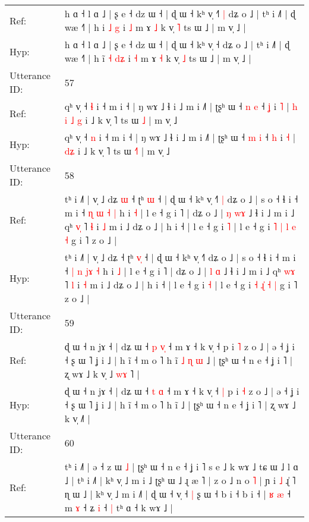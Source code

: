 \documentclass[10pt]{article}
\DeclareRobustCommand{\hl}[1]{{\textcolor{red}{#1}}}
\begin{document}
\begin{longtable}{ll}
Ref: & h ɑ ˧ l ɑ ˩ | ʂ e ˧ dz ɯ ˧ | ɖ ɯ ˧ kʰ v̩ ˧\hl{˥}\hl{ }\hl{|} dʑ o ˩ | tʰ i ˩˥ | ɖ wæ ˧˥ | h i\hl{} \hl{˩} \hl{}\hl{g} i \hl{˩} m ɤ \hl{˩} k v̩ \hl{˥} ts ɯ ˩ | m v̩ ˩ |
 \\
Hyp: & h ɑ ˧ l ɑ ˩ | ʂ e ˧ dz ɯ ˧ | ɖ ɯ ˧ kʰ v̩ ˧\hl{}\hl{}\hl{} dʑ o ˩ | tʰ i ˩˥ | ɖ wæ ˧˥ | h i\hl{̃} \hl{˧} \hl{d}\hl{ʑ} i \hl{˧} m ɤ \hl{˧} k v̩ \hl{˩} ts ɯ ˩ | m v̩ ˩ |
 \\
\midrule
Utterance ID: & 57 \\
Ref: & qʰ v̩ ˧ \hl{ɬ} i ˧ m i ˧ | ŋ wɤ ˩ ɬ i ˩ m i ˩˥ | ʈʂʰ ɯ ˧ \hl{n} \hl{e} ˧ \hl{ʝ} i \hl{˥} |\hl{ }\hl{h}\hl{ }\hl{i} \hl{˩}\hl{ }\hl{g} i ˩ k v̩ ˥ ts ɯ \hl{}\hl{˩} | m v̩ ˩
 \\
Hyp: & qʰ v̩ ˧ \hl{n} i ˧ m i ˧ | ŋ wɤ ˩ ɬ i ˩ m i ˩˥ | ʈʂʰ ɯ ˧ \hl{m} \hl{i} ˧ \hl{h} i \hl{˧} |\hl{}\hl{}\hl{}\hl{} \hl{}\hl{d}\hl{ʑ} i ˩ k v̩ ˥ ts ɯ \hl{˧}\hl{˥} | m v̩ ˩
 \\
\midrule
Utterance ID: & 58 \\
Ref: & tʰ i ˩˥ | v̩ ˩ dʑ\hl{ }\hl{ɯ} ˧ ʈʰ \hl{}\hl{ɯ} ˧ | ɖ ɯ ˧ kʰ v̩ ˧˥\hl{ }\hl{|} dʑ o ˩ | s o ˧ ɬ i ˧ m i ˧ \hl{ɳ} \hl{ɯ} \hl{}\hl{˧} \hl{|} h i \hl{˧} | l e ˧ g i ˥ | dʑ o ˩ | \hl{ŋ} \hl{w}\hl{ɤ} ˩ ɬ i ˩ m i ˩ qʰ \hl{v}\hl{̩} ˥ \hl{ɬ} i \hl{˩} m i ˩ dʑ o ˩ | h i ˧ | l e ˧ g i \hl{˥} | l e ˧ g i \hl{˥} \hl{|}\hl{ }\hl{l} \hl{e} \hl{˧} g i ˥ z o ˩ |
 \\
Hyp: & tʰ i ˩˥ | v̩ ˩ dʑ\hl{}\hl{} ˧ ʈʰ \hl{v}\hl{̩} ˧ | ɖ ɯ ˧ kʰ v̩ ˧˥\hl{}\hl{} dʑ o ˩ | s o ˧ ɬ i ˧ m i ˧ \hl{|} \hl{n} \hl{j}\hl{ɤ} \hl{˧} h i \hl{˩} | l e ˧ g i ˥ | dʑ o ˩ | \hl{l} \hl{}\hl{ɑ} ˩ ɬ i ˩ m i ˩ qʰ \hl{w}\hl{ɤ} ˥ \hl{l} i \hl{˧} m i ˩ dʑ o ˩ | h i ˧ | l e ˧ g i \hl{˧} | l e ˧ g i \hl{˧} \hl{}\hl{ɻ}\hl{̍} \hl{˧} \hl{|} g i ˥ z o ˩ |
 \\
\midrule
Utterance ID: & 59 \\
Ref: & ɖ ɯ ˧ n jɤ ˧ | dʑ ɯ ˧ \hl{p} \hl{v}\hl{̩} ˧ m ɤ ˧ k v̩ ˧\hl{}\hl{} p i \hl{˥} z o ˩ | ə ˧ ʝ i ˧ ʂ ɯ ˥ ʝ i ˩ | h ĩ ˧ m o ˥ h ĩ\hl{ }\hl{˩}\hl{ }\hl{ɳ}\hl{ }\hl{ɯ} ˩ | ʈʂʰ ɯ ˧ n e ˧ ʝ i ˥ | ʐ wɤ ˩ k v̩ ˩\hl{ }\hl{w}\hl{ɤ}\hl{ }˥ |
 \\
Hyp: & ɖ ɯ ˧ n jɤ ˧ | dʑ ɯ ˧ \hl{t} \hl{}\hl{ɑ} ˧ m ɤ ˧ k v̩ ˧\hl{ }\hl{|} p i \hl{˧} z o ˩ | ə ˧ ʝ i ˧ ʂ ɯ ˥ ʝ i ˩ | h ĩ ˧ m o ˥ h ĩ\hl{}\hl{}\hl{}\hl{}\hl{}\hl{} ˩ | ʈʂʰ ɯ ˧ n e ˧ ʝ i ˥ | ʐ wɤ ˩ k v̩ ˩\hl{}\hl{}\hl{}\hl{}˥ |
 \\
\midrule
Utterance ID: & 60 \\
Ref: & tʰ i ˩˥ | ə ˧ z ɯ \hl{˩} | ʈʂʰ ɯ ˧ n e ˧ ʝ i ˥ s e ˩ k wɤ ˩ tɕ ɯ ˩ l ɑ ˩ | tʰ i ˩˥ | kʰ v̩ ˩ m i ˩ ʈʂʰ ɯ ˩ ɻ æ ˥ | z o ˩ n o \hl{˥} | ɲ i\hl{ }\hl{˩} ɻ̍ ˥ ɳ ɯ ˩ | kʰ v̩ ˩ m i ˩˥ | ɖ ɯ ˧ v̩ ˧\hl{ }\hl{|} ʂ ɯ ˧ b i ˧ b i ˧ |\hl{ }\hl{ʁ} \hl{æ} ˧ m \hl{ɤ} ˧ ʑ \hl{i} ˧\hl{ }\hl{|} tʰ ɑ ˧ k wɤ ˩ |

\end{longtable}
\end{document}
